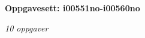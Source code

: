 \centerline{\bf Oppgavesett: i00551no-i00560no}
\vskip 10pt
\centerline{\it 10 oppgaver}\vskip 10pt
\vskip 10pt
